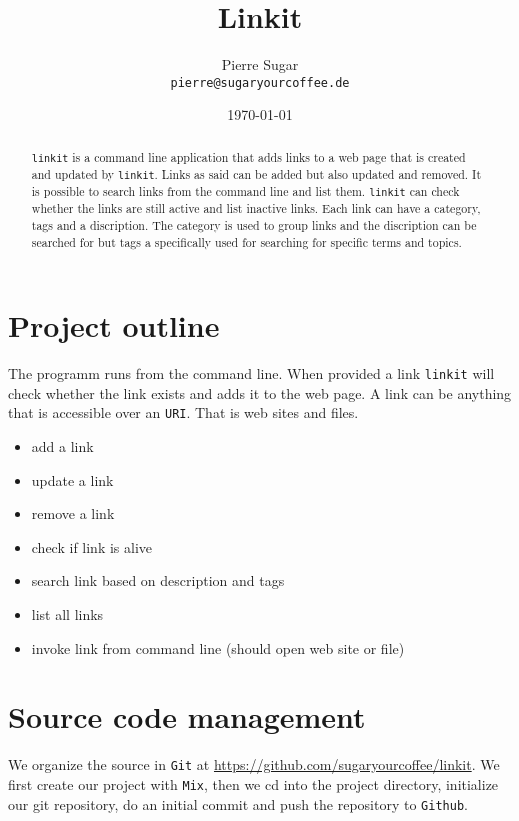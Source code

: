 \documentclass[10pt, a4paper]{article}
\begin{document}
\title{Linkit}
\author{Pierre Sugar\\
\texttt{pierre@sugaryourcoffee.de}}
\date{\today}
\maketitle

\begin{abstract}
\texttt{linkit} is a command line application that adds links to a web page that
is created and updated by \texttt{linkit}. Links as said can be added but also
updated and removed. It is possible to search links from the command line and
list them. \texttt{linkit} can check whether the links are still active and
list inactive links. Each link can have a category, tags and a discription. The
category is used to group links and the discription can be searched for but
tags a specifically used for searching for specific terms and topics.
\end{abstract}

\section{Project outline}
The programm runs from the command line. When provided a link \texttt{linkit}
will check whether the link exists and adds it to the web page. A link can be
anything that is accessible over an \texttt{URI}. That is web sites and files.

\begin{itemize}
  \item add a link
  \item update a link
  \item remove a link
  \item check if link is alive
  \item search link based on description and tags
  \item list all links
  \item invoke link from command line (should open web site or file)
\end{itemize}

\section{Source code management}
We organize the source in \texttt{Git} at 
\url{https://github.com/sugaryourcoffee/linkit}. We first create our project
with \texttt{Mix}, then we cd into the project directory, initialize our git
repository, do an initial commit and push the repository to \texttt{Github}.
\end{document}
